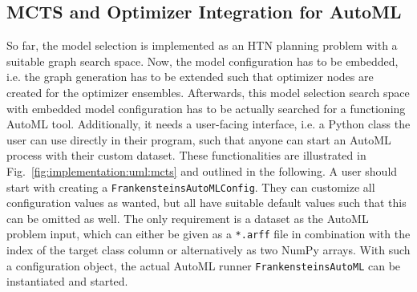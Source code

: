 \subsection{MCTS and Optimizer Integration for AutoML}
\label{sec:implementation:components:mcts}
So far, the model selection is implemented as an HTN planning problem with a suitable graph search space.
Now, the model configuration has to be embedded, i.e. the graph generation has to be extended such that optimizer nodes are created for the optimizer ensembles.
Afterwards, this model selection search space with embedded model configuration has to be actually searched for a functioning AutoML tool.
Additionally, it needs a user-facing interface, i.e. a Python class the user can use directly in their program, such that anyone can start an AutoML process with their custom dataset.
These functionalities are illustrated in Fig.~\ref{fig:implementation:uml:mcts} and outlined in the following.\newline
A user should start with creating a \texttt{FrankensteinsAutoMLConfig}.
They can customize all configuration values as wanted, but all have suitable default values such that this can be omitted as well.
The only requirement is a dataset as the AutoML problem input, which can either be given as a \texttt{*.arff} file in combination with the index of the target class column or alternatively as two NumPy arrays.
With such a configuration object, the actual AutoML runner \texttt{FrankensteinsAutoML} can be instantiated and started.

